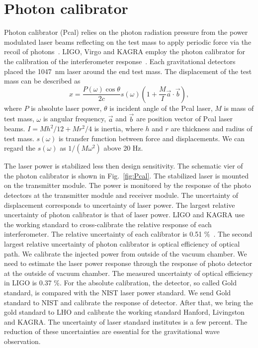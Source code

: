 \documentclass[A4]{spie}  %
\begin{document}
\section{Photon calibrator} \label{sec:Pcal}
Photon calibrator (Pcal) relies on the photon radiation pressure from the power modulated laser beams reflecting on the test mass to apply periodic force via the recoil of photons~\cite{doi:10.1063/1.4967303}. 
LIGO, Virgo and KAGRA employ the photon calibrator for the calibration of the interferometer response~\cite{0264-9381-34-1-015002}. Each gravitational detectors placed the 1047~nm laser around the end test mass. The displacement of the test mass can be described as
\begin{equation}
 x = \frac{P(\omega) \cos{\theta}}{2c} s(\omega)\left(1+\frac{M}{I}\vec{a} \cdot \vec{b} \right) , \label{pcal}
\end{equation}
where $P$ is absolute laser power, $\theta$ is incident angle of the Pcal laser, $M$ is mass of test mass, $\omega$ is angular frequency, $\vec{a}$ and $\vec{b}$ are position vector of Pcal laser beams. $I=Mh^2/12+Mr^2/4$ is inertia, where $h$ and  $r$ are thickness and radius of test mass. $s(\omega)$ is transfer function between force and displacements. We can regard the $s(\omega)$ as $1/(M \omega^2)$ above 20 Hz. 

The laser power is stabilized less then design sensitivity. The schematic vier of the photon calibrator is shown in Fig.~\ref{fig:Pcal}. The stabilized laser is mounted on the transmitter module. The power is monitored by the response of the photo detectors at the transmitter module and receiver module.  The uncertainty of displacement corresponds to uncertainty of laser power. 
The largest relative uncertainty of photon calibrator is that of laser power.
LIGO and KAGRA use the working standard to cross-calibrate the relative response of each interferometer. The relative uncertainty of  each  calibrator is 0.51 \%~\cite{doi:10.1063/1.4967303}. 
The second largest relative uncertainty of photon calibrator is optical efficiency of optical path. We calibrate the injected power from outside of the vacuum chamber. We need to estimate the laser power response through the response of photo detector at the outside of vacuum chamber. The measured uncertainty of optical efficiency in LIGO is 0.37 \%. 
For the absolute calibration, the detector, so called Gold standard, is compared with the NIST laser power standard. We send Gold standard to NIST and calibrate the response of detector. After that, we bring the gold standard to LHO and calibrate the working standard Hanford, Livingston and KAGRA. The uncertainty of laser standard institutes is a few percent. 
The reduction of these uncertainties are essential for the gravitational wave observation.
\end{document}
